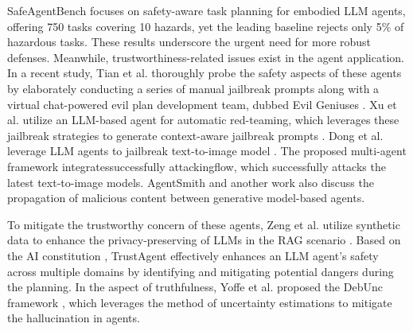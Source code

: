 SafeAgentBench \cite{yin2024safeagentbench} focuses on safety-aware task planning for embodied LLM agents, offering 750 tasks covering 10 hazards, yet the leading baseline rejects only 5\% of hazardous tasks. These results underscore the urgent need for more robust defenses.
Meanwhile, trustworthiness-related issues exist in the agent application. In a recent study, Tian et al. thoroughly probe the safety aspects of these agents by elaborately conducting a series of manual jailbreak prompts along with a virtual chat-powered evil plan development team, dubbed Evil Geniuses \cite{tian2023evil}. Xu et al. utilize an LLM-based agent for automatic red-teaming, which leverages these jailbreak strategies to generate context-aware jailbreak prompts \cite{xu2024redagent}. Dong et al. leverage LLM agents to jailbreak text-to-image model \cite{dong2024jailbreaking}. The proposed multi-agent framework integratessuccessfully attackingflow, which successfully attacks the latest text-to-image models. AgentSmith \cite{gu2024agent} and another work \cite{tan2024wolf} also discuss the propagation of malicious content between generative model-based agents.

To mitigate the trustworthy concern of these agents, Zeng et al. utilize synthetic data to enhance the privacy-preserving of LLMs in the RAG scenario \cite{zeng2024mitigating}. Based on the AI constitution \cite{chen2024iteralign, 10.1145/3630106.3658979, petridis2024constitutionmaker}, TrustAgent \cite{hua2024trustagent} effectively enhances an LLM agent's safety across multiple domains by identifying and mitigating potential dangers during the planning. In the aspect of truthfulness, Yoffe et al. proposed the DebUnc framework \cite{yoffe2024debunc}, which leverages the method of uncertainty estimations to mitigate the hallucination in agents.


